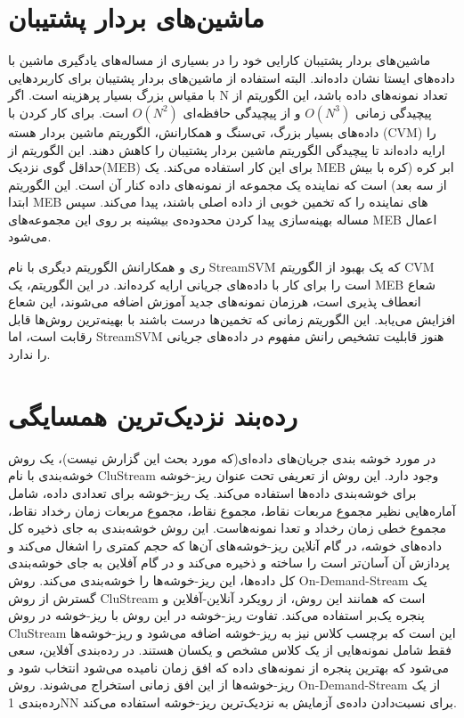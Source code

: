 \section{ماشین‌های بردار پشتیبان}

ماشین‌های بردار پشتیبان
کارایی خود را در بسیاری از مساله‌های یادگیری ماشین با داده‌های ایستا نشان داده‌‌اند. البته استفاده از ماشین‌های بردار پشتیبان برای کاربردهایی با مقیاس بزرگ بسیار پرهزینه است. اگر N تعداد نمونه‌های داده باشد، این الگوریتم از پیچیدگی زمانی $ O(N^3) $ و از پیچیدگی حافظه‌ای $ O(N^2) $ است. برای کار کردن با داده‌های بسیار بزرگ، تی‌سنگ
و همکارانش، الگوریتم ماشین بردار هسته
(CVM)
 را ارایه داده‌اند تا پیچیدگی الگوریتم ماشین بردار پشتیبان را کاهش دهند. این الگوریتم از حداقل گوی نزدیک(MEB) برای این کار استفاده می‌کند. یک MEB ابر کره
(کره با بیش از سه بعد) است که نماینده یک مجموعه از نمونه‌های داده کنار آن است. این الگوریتم ابتدا MEB های نماینده را که تخمین خوبی از داده اصلی باشند، پیدا می‌کند. سپس مساله بهینه‌سازی پیدا کردن محدوده‌ی بیشینه بر روی این مجموعه‌های MEB اعمال می‌شود.


ری
و همکارانش الگوریتم دیگری با نام StreamSVM که یک بهبود از الگوریتم CVM است را برای کار با داده‌های جریانی ارایه کرده‌اند. در این الگوریتم، یک MEB شعاع انعطاف پذیری است، هرزمان نمونه‌های جدید آموزش اضافه می‌شوند، این شعاع افزایش می‌یابد. این الگوریتم زمانی که تخمین‌ها درست باشند با بهینه‌ترین روش‌ها قابل رقابت است، اما StreamSVM هنوز قابلیت تشخیص رانش‌ مفهوم در داده‌های جریانی را ندارد.

\section{رده‌بند نزدیک‌ترین همسایگی}

در مورد خوشه بندی جریان‌های داده‌ای(که مورد بحث این گزارش نیست)، یک روش خوشه‌بندی با نام CluStream وجود دارد. این روش از تعریفی تحت عنوان ریز-خوشه
برای خوشه‌بندی داده‌ها استفاده می‌کند. یک ریز-خوشه برای تعدادی داده، شامل آماره‌هایی نظیر مجموع مربعات نقاط، مجموع نقاط، مجموع مربعات زمان رخداد نقاط، مجموع خطی زمان رخداد و تعدا نمونه‌هاست. این روش خوشه‌بندی به جای ذخیره کل داده‌های خوشه، در گام آنلاین ریز-خوشه‌های آن‌ها که حجم کمتری را اشغال می‌کند و پردازش آن آسان‌تر است را ساخته و ذخیره می‌کند و در گام آفلاین به جای خوشه‌بندی کل داده‌ها، این ریز-خوشه‌ها را خوشه‌بندی می‌کند.
روش On-Demand-Stream یک گسترش از روش CluStream است که همانند این روش، از رویکرد آنلاین-آفلاین و پنجره یک‌بر استفاده می‌کند. تفاوت ریز-خوشه در این روش با ریز-خوشه در روش CluStream این است که برچسب کلاس نیز به ریز-خوشه اضافه می‌شود و ریز-خوشه‌ها فقط شامل نمونه‌هایی از یک کلاس مشخص و یکسان هستند. در رده‌بندی آفلاین، سعی می‌شود که بهترین پنجره از نمونه‌های داده که افق زمان
نامیده می‌شود انتخاب شود و ریز-خوشه‌ها از این افق زمانی استخراج می‌شوند. روش On-Demand-Stream از یک رده‌بندی 1NN برای نسبت‌دادن داده‌ی آزمایش به نزدیک‌ترین ریز-خوشه استفاده‌ می‌کند.

